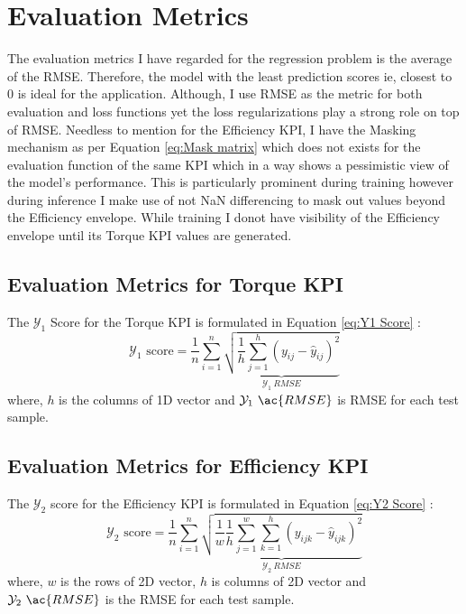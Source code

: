 \documentclass{report} %
\begin{document}
\section{Evaluation Metrics}
The evaluation metrics I have regarded for the regression problem is the average of the \ac{RMSE}. 
Therefore, the model with the least prediction scores ie, closest to 0 is ideal for the application. 
Although, I use \ac{RMSE} as the metric for both evaluation and loss functions yet the loss regularizations play a strong role on top of \ac{RMSE}.
Needless to mention for the Efficiency \ac{KPI}, I have the Masking mechanism as per Equation \ref{eq:Mask matrix} which does not exists for the evaluation function of the 
same \ac{KPI} which in a way shows a pessimistic view of the model's performance. This is particularly prominent during training however during inference I make use of 
not \ac{NaN} differencing to mask out values beyond the Efficiency envelope. While training I donot have visibility of the Efficiency envelope until its Torque \ac{KPI} 
values are generated.

\subsection{Evaluation Metrics for Torque KPI}\label{subsec:Evaluation Metrics for 2D KPI}
The $\mathcal{Y}_1$ Score for the Torque \ac{KPI} is formulated in Equation \ref{eq:Y1 Score} :
\begin{equation}
\text{$\mathcal{Y}_1$ score} = \frac{1}{n} \sum_{i=1}^{n} \underbrace{ \sqrt{\frac{1}{h} \sum_{j=1}^{h} (y_{ij} - \hat{y}_{ij})^2}}_{\mathcal{Y}_1\ RMSE}
\label{eq:Y1 Score}
\end{equation}
where, \(h\) is the columns of 1D vector and \(\mathcal{Y}_1\ \ac{RMSE}\) is \ac{RMSE} for each test sample.

\subsection{Evaluation Metrics for Efficiency KPI}\label{subsec:Evaluation Metrics for 3D KPI}
The $\mathcal{Y}_2$ score for the Efficiency \ac{KPI} is formulated in Equation \ref{eq:Y2 Score} :
\begin{equation}
    \text{$\mathcal{Y}_2$ score} = \frac{1}{n} \sum_{i=1}^{n} \underbrace{ \sqrt{\frac{1}{w} \frac{1}{h} \sum_{j=1}^{w} \sum_{k=1}^{h} (y_{ijk} - \hat{y}_{ijk})^2}}_{\mathcal{Y}_2\ RMSE}
    \label{eq:Y2 Score}
\end{equation}
where, \(w\) is the rows of 2\ac{D} vector, \(h\) is columns of 2\ac{D} vector and \(\mathcal{Y}_2\ \ac{RMSE}\) is the \ac{RMSE} for each test sample.\\
\end{document}
